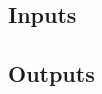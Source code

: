 \documentclass[11pt,a4paper]{article}
\begin{document}
\subsection{Inputs}

\subsection{Outputs}
\end{document}
